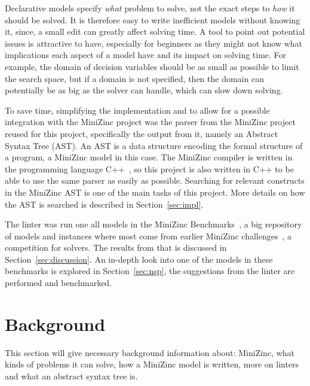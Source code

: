 \documentclass[a4paper,12pt]{article}
\begin{document}
Declarative models specify \emph{what} problem to solve, not the exact steps to \emph{how}
it should be solved. It is therefore easy to write inefficient models without knowing it,
since, a small edit can greatly affect solving time. A tool to point out potential issues
is attractive to have, especially for beginners as they might not know what implications
each aspect of a model have and its impact on solving time. For example, the domain of
decision variables should be as small as possible to limit the search space, but if a
domain is not specified, then the domain can potentially be as big as the solver can
handle, which can slow down solving.

To save time, simplifying the implementation and to allow for a possible integration with
the MiniZinc project was the parser from the MiniZinc project reused for this project,
specifically the output from it, namely an Abstract Syntax Tree (AST). An AST is a data
structure encoding the formal structure of a program, a MiniZinc model in this case. The
MiniZinc compiler is written in the programming language C++~\cite{cpp}, so this project
is also written in C++ to be able to use the same parser as easily as possible.
Searching
for relevant constructs in the MiniZinc AST is one of the main tasks of this project. More
details on how the AST is searched is described in Section~\ref{sec:impl}.

\begin{sloppypar}
The linter was run one all models in the MiniZinc Benchmarks~\cite{mznbench}, a
big repository of models and instances where most come from earlier MiniZinc
challenges~\cite{MZN:Challenge}, a competition for solvers. The results from that is
discussed in Section~\ref{sec:discussion}. An in-depth look into one of the models in
these benchmarks is explored in Section~\ref{sec:nsp}, the suggestions from the linter are
performed and benchmarked.
\end{sloppypar}

\section{Background}\label{sec:bakgrund}
This section will give necessary background information about: MiniZinc, what kinds of
problems it can solve, how a MiniZinc model is written, more on linters and what
an abstract syntax tree is.
\end{document}
